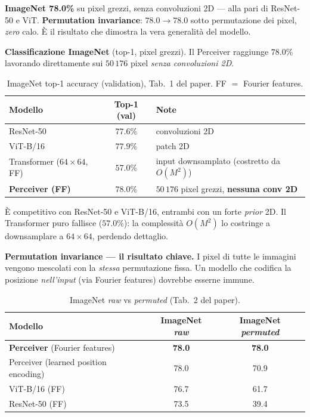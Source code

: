 \documentclass[11pt]{article}
\begin{document}
\begin{brevebox}[title={\textbf{In breve}}]
\textbf{ImageNet 78.0\%} su pixel grezzi, senza convoluzioni 2D --- alla pari di ResNet-50 e ViT. \textbf{Permutation invariance}: $78.0 \to 78.0$ sotto permutazione dei pixel, \emph{zero} calo. È il risultato che dimostra la vera generalità del modello.
\end{brevebox}

\textbf{Classificazione ImageNet} (top-1, pixel grezzi). Il Perceiver raggiunge $\mathbf{78.0\%}$ lavorando direttamente sui $50\,176$ pixel \emph{senza convoluzioni 2D}.

\begin{table}[htbp]
\centering
\caption{ImageNet top-1 accuracy (validation), Tab.~1 del paper. FF $=$ Fourier features.}
\small
\begin{tabular}{@{}lcl@{}}
\toprule
\textbf{Modello} & \textbf{Top-1 (val)} & \textbf{Note} \\
\midrule
ResNet-50                  & $77.6\%$ & convoluzioni 2D \\
ViT-B/16                   & $77.9\%$ & patch 2D \\
Transformer ($64{\times}64$, FF) & $57.0\%$ & input downsamplato (costretto da $O(M^2)$) \\
\textbf{Perceiver (FF)}    & $\mathbf{78.0\%}$ & $50\,176$ pixel grezzi, \textbf{nessuna conv 2D} \\
\bottomrule
\end{tabular}
\end{table}

È competitivo con ResNet-50 e ViT-B/16, entrambi con un forte \emph{prior} 2D. Il Transformer puro fallisce ($57.0\%$): la complessità $O(M^2)$ lo costringe a downsamplare a $64\times64$, perdendo dettaglio.

\textbf{Permutation invariance --- il risultato chiave.} I pixel di tutte le immagini vengono mescolati con la \emph{stessa} permutazione fissa. Un modello che codifica la posizione \emph{nell'input} (via Fourier features) dovrebbe esserne immune.

\begin{table}[htbp]
\centering
\caption{ImageNet \emph{raw} vs \emph{permuted} (Tab.~2 del paper).}
\small
\begin{tabular}{@{}lcc@{}}
\toprule
\textbf{Modello} & \textbf{ImageNet \emph{raw}} & \textbf{ImageNet \emph{permuted}} \\
\midrule
\textbf{Perceiver} (Fourier features)  & \textbf{78.0} & \textbf{78.0} \\
Perceiver (learned position encoding)  & 78.0          & 70.9 \\
ViT-B/16 (FF)                          & 76.7          & 61.7 \\
ResNet-50 (FF)                         & 73.5          & 39.4 \\
\bottomrule
\end{tabular}
\end{table}
\end{document}
